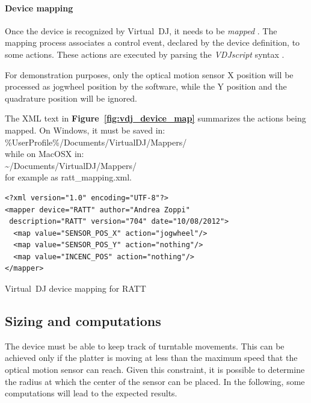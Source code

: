 \documentclass[a4paper,10pt]{article}
\makeatletter
\newenvironment{figurehere}{\def\@captype{figure}\vspace{2ex}}{\vspace{2ex}}
\newcommand{\citef}[1]{\textbf{Figure~\ref{#1}}}
\makeatother
\begin{document}
\begin{multicols}{2}
\paragraph{Device mapping}
Once the device is recognized by Virtual~DJ, it needs to be \emph{mapped}
\cite{vdj_mapping}. The mapping process associates a control event, declared
by the device definition, to some actions. These actions are executed by
parsing the \emph{VDJscript} syntax \cite{vdj_script}.

For demonstration purposes, only the optical motion sensor X position will be
processed as jogwheel position by the software, while the Y position and the
quadrature position will be ignored.

The XML text in \citef{fig:vdj_device_map} summarizes the actions being
mapped. On Windows, it must be saved in:\\
{\ttfamily\small {\%}UserProfile{\%}/Documents/VirtualDJ/Mappers/}\\
while on MacOSX in:\\
{\ttfamily\small {\textasciitilde}/Documents/VirtualDJ/Mappers/}\\
for example as {\ttfamily\small ratt{\_}mapping.xml}.

\begin{figurehere}
\begin{mdframed}[
	innerleftmargin=4pt,
	innerrightmargin=4pt,
	innertopmargin=0pt,
	innerbottommargin=0pt
]
\begin{lstlisting}[language=simpleXML]
<?xml version="1.0" encoding="UTF-8"?>
<mapper device="RATT" author="Andrea Zoppi"
 description="RATT" version="704" date="10/08/2012">
  <map value="SENSOR_POS_X" action="jogwheel"/>
  <map value="SENSOR_POS_Y" action="nothing"/>
  <map value="INCENC_POS" action="nothing"/>
</mapper>
\end{lstlisting}
\end{mdframed}
\caption{Virtual~DJ device mapping for RATT}
\label{fig:vdj_device_map}
\end{figurehere}


\subsection{Sizing and computations}

The device must be able to keep track of turntable movements. This can be
achieved only if the platter is moving at less than the maximum speed that
the optical motion sensor can reach. Given this constraint, it is possible to
determine the radius at which the center of the sensor can be placed. In the
following, some computations will lead to the expected results.



\end{multicols}
\end{document}
